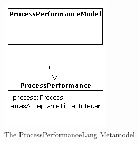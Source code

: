 \begin{figure}
	\centering
		\includegraphics{images/ProcessPerformance.png}
	\caption{The ProcessPerformanceLang Metamodel}
	\label{fig:ProcessPerformance}
\end{figure}

